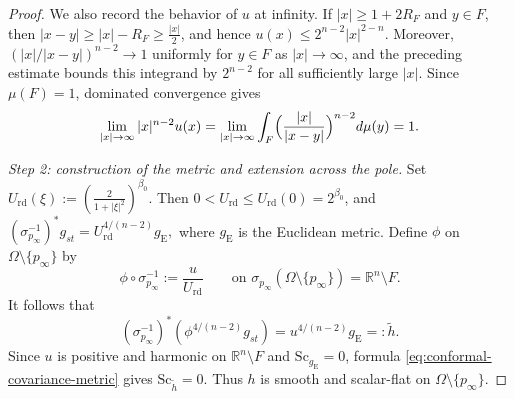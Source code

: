 \documentclass[12pt,oneside,a4paper]{article}
\theoremstyle{mytheorem}
\theoremstyle{remark}
\theoremstyle{definition}
\begin{document}
\begin{proof}
We also record the behavior of $u$ at infinity.  If
$|x|\ge1+2R_F$ and $y\in F$, then
\(|x-y|\ge |x|-R_F\ge\frac{|x|}{2}\),
and hence \(u(x)\le2^{n-2}|x|^{2-n}\).
Moreover, $(|x|/|x-y|)^{n-2}\to1$ uniformly for $y\in F$ as
$|x|\to\infty$, and the preceding estimate bounds this integrand by
$2^{n-2}$ for all sufficiently large $|x|$.  Since $\mu(F)=1$,
dominated convergence gives
\begin{equation}\label{eq:u-infinity}
 \lim_{|x|\to\infty}|x|^{n-2}u(x)
 =\lim_{|x|\to\infty}\int_F\Bigl(\frac{|x|}{|x-y|}\Bigr)^{n-2}d\mu(y)
 =1.
\end{equation}

\smallskip\noindent
\emph{Step 2: construction of the metric and extension across the
pole.}
Set
$U_{\mathrm{rd}}(\xi):=\left(\frac{2}{1+|\xi|^2}\right)^{\beta_0}.$
Then $0<U_{\mathrm{rd}}\le U_{\mathrm{rd}}(0)=2^{\beta_0}$, and
$(\sigma_{p_\infty}^{-1})^*g_{st}
=U_{\mathrm{rd}}^{4/(n-2)}g_{\mathrm E},$
where $g_{\mathrm E}$ is the Euclidean metric.  Define $\phi$ on
$\Omega\setminus\{p_\infty\}$ by
\begin{equation}\label{eq:phi-chart}
 \phi\circ\sigma_{p_\infty}^{-1}:=\frac{u}{U_{\mathrm{rd}}}
 \qquad\text{on }\sigma_{p_\infty}(\Omega\setminus\{p_\infty\})=\mathbb{R}^n\setminus F.
\end{equation}
It follows that
\[
 (\sigma_{p_\infty}^{-1})^*
 \left(\phi^{4/(n-2)}g_{st}\right)
 =
 u^{4/(n-2)}g_{\mathrm E}
 =:\widetilde h.
\]
Since $u$ is positive and harmonic on $\mathbb{R}^n\setminus F$ and
$\mathrm{Sc}_{g_{\mathrm E}}=0$, formula
\eqref{eq:conformal-covariance-metric} gives
$\mathrm{Sc}_{\widetilde h}=0$.  Thus $h$ is smooth and scalar-flat on
$\Omega\setminus\{p_\infty\}$.


\end{proof}
\end{document}
